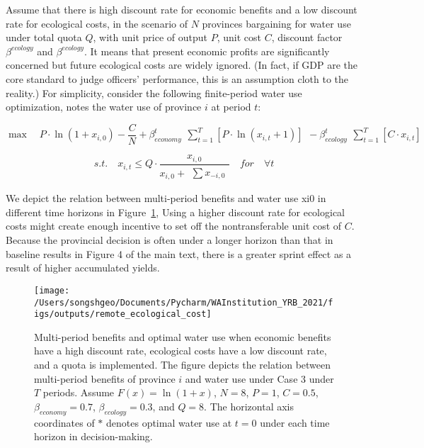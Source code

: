 \documentclass{article}
\begin{document}
Assume that there is high discount rate for economic benefits and a low discount rate for ecological costs, in the scenario of $N$ provinces bargaining for water use under total quota $Q$, with unit price of output $P$, unit cost $C$, discount factor $\beta^{ecology}$ and $\beta^{ecology}$.
It means that present economic profits are significantly concerned but future ecological costs are widely ignored. (In fact, if GDP are the core standard to judge officers’ performance, this is an assumption cloth to the reality.) For simplicity, consider the following finite-period water use optimization, notes the water use of province $i$ at period $t$:

\[ \max \quad P \cdot \ln(1+x_{i,0})-\frac{C}{N}+\beta_{economy}^t \begin{matrix} \sum_{t=1}^T [P \cdot \ln(x_{i,t}+1)]  \end{matrix} - \beta_{ecology}^t \begin{matrix} \sum_{t=1}^T [C \cdot x_{i,t}] \end{matrix}\]

\[s.t. \quad x_{i,t} \leq Q \cdot \frac{x_{i,0}}{x_{i,0} + \begin{matrix} \sum x_{-i,0} \end{matrix}} \quad for \quad \forall t\]

We depict the relation between multi-period benefits and water use xi0 in different time horizons in Figure~\ref{fig:remote_cost}, Using a higher discount rate for ecological costs might create enough incentive to set off the nontransferable unit cost of $C$.
Because the provincial decision is often under a longer horizon than that in baseline results in Figure 4 of the main text, there is a greater sprint effect as a result of higher accumulated yields.

\begin{figure}[h!]
	\centering
	\texttt{[image: /Users/songshgeo/Documents/Pycharm/WAInstitution\_YRB\_2021/figs/outputs/remote\_ecological\_cost]}
	\caption{Multi-period benefits and optimal water use when economic benefits have a high discount rate, ecological costs have a low discount rate, and a quota is implemented. The figure depicts the relation between multi-period benefits of province $i$ and water use under Case 3 under $T$ periods. Assume $F(x)=\ln(1+x)$, $N=8$, $P=1$, $C=0.5$, $\beta_{economy}=0.7$, $\beta_{ecology}=0.3$, and $Q=8$. The horizontal axis coordinates of $*$ denotes optimal water use at $t=0$ under each time horizon in decision-making.
	}
	\label{fig:remote_cost}
\end{figure}



\end{document}
